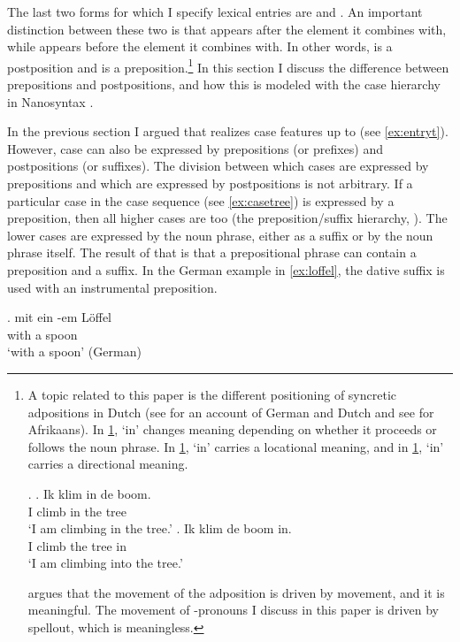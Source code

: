 \documentclass[11pt,a4paper]{article}
\begin{document}
The last two forms for which I specify lexical entries are  and . An important distinction between these two is that  appears after the element it combines with, while  appears before the element it combines with. In other words,  is a postposition and  is a preposition.\footnote{
A topic related to this paper is the different positioning of syncretic adpositions in Dutch (see \citealt{caha2010} for an account of German and Dutch and see \citealt{pretorius2017} for Afrikaans). In \ref{ex:dutchin},  `in' changes meaning depending on whether it proceeds or follows the noun phrase. In \ref{ex:dutch-in-loc},  `in' carries a locational meaning, and in \ref{ex:dutch-in-dir},  `in' carries a directional meaning.

\ex.\label{ex:dutchin}
\ag. Ik klim in de boom.\\
 I climb in the tree\\
 `I am climbing in the tree.'\label{ex:dutch-in-loc}
\bg. Ik klim de boom in.\\
 I climb the tree in\\
 `I am climbing into the tree.'\label{ex:dutch-in-dir}

\citet{caha2010} argues that the movement of the adposition is driven by movement, and it is meaningful. The movement of -pronouns I discuss in this paper is driven by spellout, which is meaningless.}
In this section I discuss the difference between prepositions and postpositions, and how this is modeled with the case hierarchy in Nanosyntax \citep{caha2009}.

In the previous section I argued that  realizes case features up to  (see \ref{ex:entryt}). However, case can also be expressed by prepositions (or prefixes) and postpositions (or suffixes). The division between which cases are expressed by prepositions and which are expressed by postpositions is not arbitrary. If a particular case in the case sequence (see \ref{ex:casetree}) is expressed by a preposition, then all higher cases are too (the preposition/suffix hierarchy, ). The lower cases are expressed by the noun phrase, either as a suffix or by the noun phrase itself.
The result of that is that a prepositional phrase can contain a preposition and a suffix. In the German example in \ref{ex:loffel}, the dative suffix is used with an instrumental preposition.

\exg. mit ein -em Löffel\\
with a  spoon\\
`with a spoon' \hfill (German)\label{ex:loffel}
\end{document}
